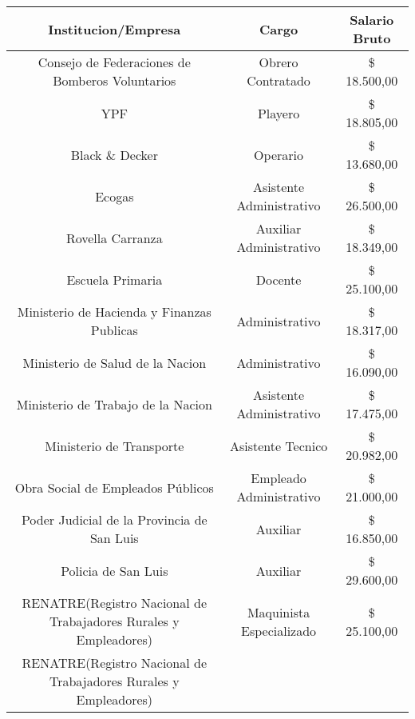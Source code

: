 \begin{table}[H]
  \centering\scriptsize
    \begin{tabular}{|c|c|c|}
    \hline
    \textcolor[rgb]{ .122,  .286,  .49}{\textbf{Institucion/Empresa}} &
      \textcolor[rgb]{ .122,  .286,  .49}{\textbf{Cargo}} &
      \textcolor[rgb]{ .122,  .286,  .49}{\textbf{Salario Bruto}}
      \bigstrut\\
    \hline
    Consejo de Federaciones de Bomberos Voluntarios &
      Obrero Contratado &
      \$ 18.500,00
      \bigstrut\\
    \hline
    YPF &
      Playero &
      \$ 18.805,00
      \bigstrut\\
    \hline
    Black \& Decker &
      Operario &
      \$ 13.680,00
      \bigstrut\\
    \hline
    Ecogas &
      Asistente Administrativo &
      \$ 26.500,00
      \bigstrut\\
    \hline
    Rovella Carranza &
      Auxiliar Administrativo &
      \$ 18.349,00
      \bigstrut\\
    \hline
    Escuela Primaria &
      Docente &
      \$ 25.100,00
      \bigstrut\\
    \hline
    Ministerio de Hacienda y Finanzas Publicas &
      Administrativo &
      \$ 18.317,00
      \bigstrut\\
    \hline
    Ministerio de Salud de la Nacion &
      Administrativo &
      \$ 16.090,00
      \bigstrut\\
    \hline
    Ministerio de Trabajo de la Nacion &
      Asistente Administrativo &
      \$ 17.475,00
      \bigstrut\\
    \hline
    Ministerio de Transporte &
      Asistente Tecnico &
      \$ 20.982,00
      \bigstrut\\
    \hline
    Obra Social de Empleados Públicos &
      Empleado Administrativo &
      \$ 21.000,00
      \bigstrut\\
    \hline
    Poder Judicial de la Provincia de San Luis &
      Auxiliar  &
      \$ 16.850,00
      \bigstrut\\
    \hline
    Policia de San Luis &
      Auxiliar &
      \$ 29.600,00
      \bigstrut\\
    \hline
    RENATRE(Registro Nacional de Trabajadores Rurales y Empleadores) &
      Maquinista Especializado &
      \$ 25.100,00
      \bigstrut\\
    \hline
    RENATRE(Registro Nacional de Trabajadores Rurales y Empleadores) &

\end{tabular}
\end{table}
